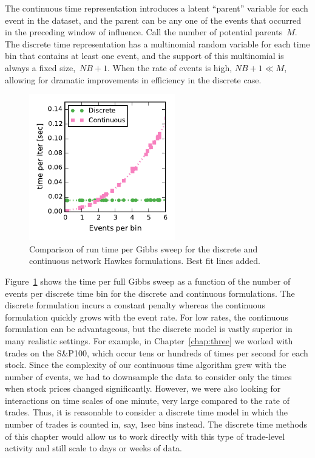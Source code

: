 The continuous time representation introduces a latent ``parent''
variable for each event in the dataset, and the parent can be any one
of the events that occurred in the preceding window of influence. Call
the number of potential parents~$M$. The discrete time representation
has a multinomial random variable for each time bin that contains at least one
event, and the support of this multinomial is always a fixed
size,~${NB+1}$.  When the rate of events is high, $NB+1 \ll M$,
allowing for dramatic improvements in efficiency in the discrete case.

\begin{figure}[t]
  \centering
  \includegraphics[width=2.5in]{figures/ch4/discrete_cont_comparison}
  \caption[Runtime comparison of continuous and discrete time Hawkes models]{
    Comparison of run time per Gibbs sweep for the discrete and continuous network Hawkes formulations. Best fit lines added.}
  \label{fig:disc_vs_cont}
\end{figure}


Figure~\ref{fig:disc_vs_cont} shows the time per full Gibbs sweep as a
function of the number of events per discrete time bin for the
discrete and continuous formulations. The discrete formulation incurs
a constant penalty whereas the continuous formulation quickly grows
with the event rate. For low rates, the continuous formulation can be
advantageous, but the discrete model is vastly superior in many
realistic settings. For example, in Chapter~\ref{chap:three} we worked with
trades on the S\&P100, which occur tens or hundreds of times per
second for each stock. Since the complexity of our continuous time algorithm grew
with the number of events, we had to downsample the data to consider only
the times when stock prices changed significantly. However, we
were also looking for interactions on time scales of one minute,
very large compared to the rate of trades. Thus, it is
reasonable to consider a discrete time model in which the number of
trades is counted in, say, $1$sec bins instead. The discrete time
methods of this chapter would allow us to work directly with this type of
trade-level activity and still scale to days or weeks of data.

